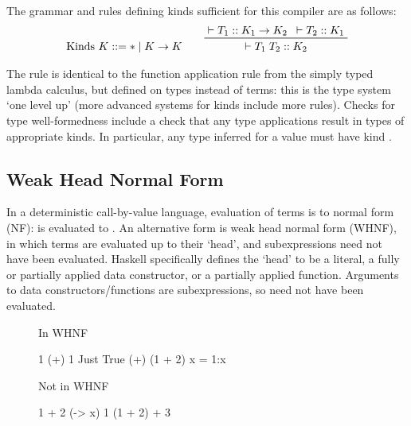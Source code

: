 \documentclass[dissertation.tex]{subfiles}
\begin{document}
{{        The grammar and rules defining kinds sufficient for this compiler are as follows:
        \begin{gather*}
        \text{Kinds } K ::= * \mid K \rightarrow K
        \qquad
        \prftree[r]{}
        {\vdash T_1 :: K_1 \rightarrow K_2}
        {\vdash T_2 :: K_1}
        {\vdash T_1\;T_2 :: K_2}
        \end{gather*}
        
        The rule is identical to the function application rule from the simply typed lambda calculus, but defined on types instead of terms: this is the type system `one level up' (more advanced systems for kinds include more rules). Checks for type well-formedness include a check that any type applications result in types of appropriate kinds. In particular, any type inferred for a value must have kind \haskell{*}.
    }
    \subsection{Weak Head Normal Form}\label{sec:whnf}
    {
        In a deterministic call-by-value language, evaluation of terms is to normal form (NF):  is evaluated to . An alternative form is weak head normal form (WHNF), in which terms are evaluated up to their `head', and subexpressions need not have been evaluated. Haskell specifically defines the `head' to be a literal, a fully or partially applied data constructor, or a partially applied function. Arguments to data constructors/functions are subexpressions, so need not have been evaluated.

        \begin{figure}[h]
        \centering
        \begin{minipage}[t]{0.2\textwidth}
        \centering
        In WHNF
        \vspace{-5mm}
        \begin{haskellfigure}
        1
        (+) 1
        Just True
        (+) (1 + 2)
        x = 1:x
        \end{haskellfigure}
        \end{minipage}
        \hspace{3cm}
        \begin{minipage}[t]{0.2\textwidth}
        \centering
        Not in WHNF
        \vspace{-5mm}
        \begin{haskellfigure}
        1 + 2
        (\x -> x) 1
        (1 + 2) + 3
        \end{haskellfigure}
        \end{minipage}
        \end{figure}

}}
\end{document}
